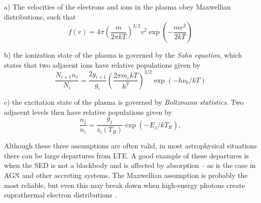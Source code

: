 a) The velocities of the electrons and ions in the plasma obey Maxwellian
distributions, such that
\begin{equation}
f(v) = 4 \pi \left( \frac{m}{2 \pi kT} \right)^{3/2} v^2 
\exp \left( - \frac{mv^2}{2kT} \right)
\label{eq:maxwellian}
\end{equation}

\smallskip

b) the ionization state of the plasma is governed by the {\em Saha equation},
which states that two adjacent ions have relative populations given by
\begin{equation}
\frac{N_{i+1}n_e}{N_i} = \frac{2g_{i+1}}{g_i} 
\left( \frac{2 \pi m_e kT}{h^2} \right)^{3/2}
\exp(-h \nu_0/kT)
\label{eq:saha}
\end{equation}

\smallskip

c) the excitation state of the plasma is governed by {\em Boltzmann statistics}.
Two adjacent levels then have relative populations given by
\begin{equation}
\frac{n_{j}}{n_i} = \frac{g_j}{z_i(T_R)} \exp(-E_j/kT_R), 
\label{eq:boltzmann}
\end{equation}

\smallskip

Although these three assumptions are often valid, in most astrophysical situations
there can be large departures from LTE. A good example of these departures is when
the SED is not a blackbody and is affected by absorption -- 
as is the case in AGN and other accreting systems. The Maxwellian assumption 
is probably the most reliable, but even this may break down
when high-energy photons create suprathermal electron distributions 
\citep{humphrey2014}. 

